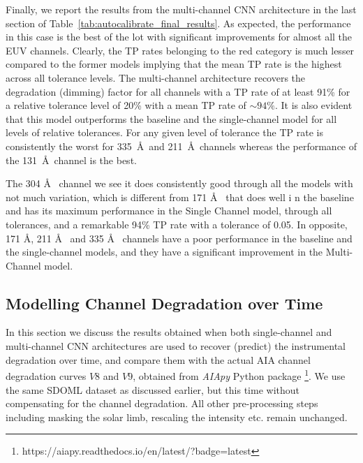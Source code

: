 \documentclass[twocolumn,usenames,dvipsnames]{aastex63}
\begin{document}
Finally, we report the results from the multi-channel CNN architecture in the last section of Table~\ref{tab:autocalibrate_final_results}. As expected, the performance in this case is the best of the lot with significant improvements for almost all the EUV channels. Clearly, the TP rates belonging to the red category is much lesser compared to the former models implying that the mean TP rate is the highest across all tolerance levels. The multi-channel architecture recovers the degradation (dimming) factor for all channels with a TP rate of at least 91\% for a relative tolerance level of 20\% with a mean TP rate of $\sim94\%$. It is also evident that this model outperforms the baseline and the single-channel model for all levels of relative tolerances.  For any given level of tolerance the TP rate is consistently the worst for 335~\AA\ and 211~\AA\ channels whereas the performance of the 131~\AA\ channel is the best.

The 304 \AA~ channel we see it does consistently good through all the models with not much variation, which is different from 171 \AA~ that does well i n the baseline and has its maximum performance in the Single Channel model, through all tolerances, and a remarkable 94\% TP rate with a tolerance of 0.05.  In opposite, 171 \AA, 211 \AA~ and 335 \AA~ channels have a poor performance in the baseline and the single-channel models, and they have a significant improvement in the Multi-Channel model.


\subsection{Modelling Channel Degradation over Time}
    \label{sec:degradation}
    
In this section we discuss the results obtained when both single-channel and multi-channel CNN architectures are used to recover (predict) the instrumental degradation over time, and compare them with the actual AIA channel degradation curves $V8$ and $V9$, obtained from \textit{AIApy} Python package \footnote{https://aiapy.readthedocs.io/en/latest/?badge=latest}. We use the same SDOML dataset as discussed earlier, but this time without compensating for the channel degradation. All other pre-processing steps including masking the solar limb, rescaling the intensity etc. remain unchanged.  %
\end{document}
